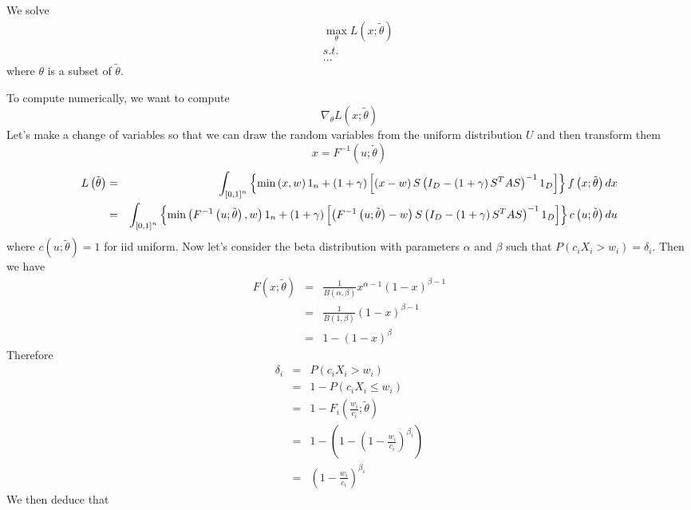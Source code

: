 \documentclass{article}
\begin{document}
We solve%
\begin{eqnarray*}
&&\max_{\theta }L\left( x;\tilde{\theta}\right)  \\
&&s.t. \\
&&...
\end{eqnarray*}%
where $\theta $ is a subset of $\tilde{\theta}$. 

To compute numerically, we want to compute%
\[
\nabla _{\theta }L\left( x;\tilde{\theta}\right) 
\]%
Let's make a change of variables so that we can draw the random variables
from the uniform distribution $U$ and then transform them%
\[
x=F^{-1}\left( u;\tilde{\theta}\right) 
\]%
\begin{eqnarray*}
L\left( \tilde{\theta}\right)  &=&\int_{\left[ 0,1\right] ^{n}}\left\{ \min
\left( x,w\right) 1_{n}+\left( 1+\gamma \right) \left[ \left( x-w\right)
S\left( I_{D}-\left( 1+\gamma \right) S^{T}AS\right) ^{-1}1_{D}\right]
\right\} f\left( x;\tilde{\theta}\right) dx \\
&=&\int_{\left[ 0,1\right] ^{n}}\left\{ \min \left( F^{-1}\left( u;\tilde{%
\theta}\right) ,w\right) 1_{n}+\left( 1+\gamma \right) \left[ \left(
F^{-1}\left( u;\tilde{\theta}\right) -w\right) S\left( I_{D}-\left( 1+\gamma
\right) S^{T}AS\right) ^{-1}1_{D}\right] \right\} c\left( u;\tilde{\theta}%
\right) du
\end{eqnarray*}%
where $c\left( u;\tilde{\theta}\right) =1$ for iid uniform. Now let's
consider the beta distribution with parameters $\alpha $ and $\beta $ such
that $P\left( c_{i}X_{i}>w_{i}\right) =\delta _{i}$. Then we have%
\begin{eqnarray*}
F\left( x;\tilde{\theta}\right)  &=&\frac{1}{B\left( \alpha ,\beta \right) }%
x^{\alpha -1}\left( 1-x\right) ^{\beta -1} \\
&=&\frac{1}{B\left( 1,\beta \right) }\left( 1-x\right) ^{\beta -1} \\
&=&1-\left( 1-x\right) ^{\beta }
\end{eqnarray*}%
Therefore%
\begin{eqnarray*}
\delta _{i} &=&P\left( c_{i}X_{i}>w_{i}\right)  \\
&=&1-P\left( c_{i}X_{i}\leq w_{i}\right)  \\
&=&1-F_{i}\left( \frac{w_{i}}{c_{i}};\tilde{\theta}\right)  \\
&=&1-\left( 1-\left( 1-\frac{w_{i}}{c_{i}}\right) ^{\beta _{i}}\right)  \\
&=&\left( 1-\frac{w_{i}}{c_{i}}\right) ^{\beta _{i}}
\end{eqnarray*}%
We then deduce that 
\end{document}
